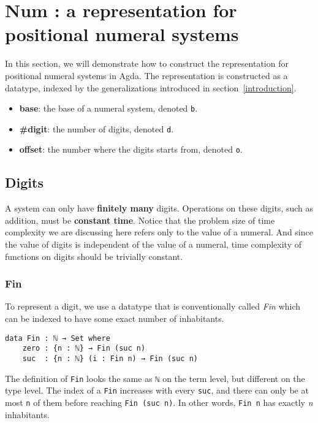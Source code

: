 \documentclass[12pt, a4paper]{article}
\begin{document}
\section{Num : a representation for positional numeral systems}\label{representation}

In this section, we will demonstrate how to construct the representation for positional
numeral systems in Agda. The representation is constructed as a datatype, indexed
by the generalizations introduced in section~\ref{introduction}.

\begin{itemize}
    \item \textbf{base}: the base of a numeral system, denoted {\lstinline|b|}.
    \item \textbf{\#digit}: the number of digits, denoted {\lstinline|d|}.
    \item \textbf{offset}: the number where the digits starts from, denoted {\lstinline|o|}.
\end{itemize}

\subsection{Digits}

A system can only have \textbf{finitely many} digits.
Operations on these digits, such as addition, must be \textbf{constant time}.
Notice that the problem size of time complexity we are discussing here refers
only to the value of a numeral. And since the value of digits is independent of
the value of a numeral, time complexity of functions on digits should be trivially
constant.

\subsubsection{Fin}

To represent a digit, we use a datatype that is conventionally called \textit{Fin}
which can be indexed to have some exact number of inhabitants.


\begin{lstlisting}
data Fin : ℕ → Set where
    zero : {n : ℕ} → Fin (suc n)
    suc  : {n : ℕ} (i : Fin n) → Fin (suc n)
\end{lstlisting}

The definition of {\lstinline|Fin|} looks the same as {\lstinline|ℕ|} on the term
level, but different on the type level. The index of a {\lstinline|Fin|} increases
with every {\lstinline|suc|}, and there can only be at most {\lstinline|n|} of
them before reaching {\lstinline|Fin (suc n)|}. In other words, {\lstinline|Fin n|}
has exactly \textit{n} inhabitants.
\end{document}
